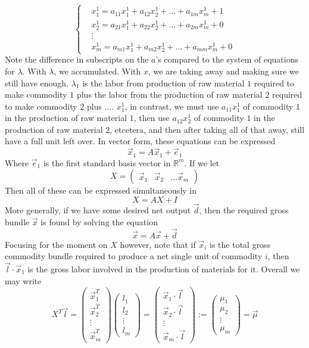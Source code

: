 \[ \begin{cases}
	& x_1^1 = a_{11}x_1^1 + a_{12}x_2^1 + \ldots + a_{1m}x_m^1 + 1 \\
	& x_2^1 = a_{21}x_1^1 + a_{22}x_2^1 + \ldots + a_{2m}x_m^1 + 0 \\
	& \vdots \\
	& x_m^1 = a_{m1}x_1^1 + a_{m2}x_2^1 + \ldots + a_{mm}x_m^1 + 0  
\end{cases} \]
Note the difference in subscripts on the $a$'s compared to the system of equations for $\lambda$. With $\lambda$, we accumulated. With $x$, we are taking away and making sure we still have enough. $\lambda_1$ is the labor from production of raw material $1$ required to make commodity $1$ plus the labor from the production of raw material $2$ required to make commodity $2$ plus $\ldots$. $x_1^1$, in contrast, we must use $a_{11}x_1^1$ of commodity $1$ in the production of raw material $1$, then use $a_{12}x_2^1$ of commodity $1$ in the production of raw material $2$, etcetera, and then after taking all of that away, still have a full unit left over. In vector form, these equations can be expressed
\[\vec{x}_1 = A\vec{x}_1 + \vec{e}_1 \]
Where $\vec{e}_1$ is the first standard basis vector in $\mathbb{R}^m$. If we let 
 \[ X = \begin{pmatrix} \vec{x}_1 & \vec{x}_2 & \ldots \vec{x}_m \end{pmatrix} \]
Then all of these can be expressed simultaneously in
\[ X = AX + I \]
More generally, if we have some desired net output $\vec{d}$, then the required gross bundle $\vec{x}$ is found by solving the equation
\[ \vec{x} = A\vec{x} + \vec{d} \]
Focusing for the moment on $X$ however, note that if $\vec{x}_i$ is the total gross commodity bundle required to produce a net single unit of commodity $i$, then $\vec{l} \cdot \vec{x}_1$ is the gross labor involved in the production of materials for it. Overall we may write
\[ X^T\vec{l} = \begin{pmatrix} \vec{x}_1^T \\ \vec{x}_2^T \\ \vdots \\ \vec{x}_m^T  \end{pmatrix}\begin{pmatrix} l_1 \\ l_2 \\ \vdots \\ l_m \end{pmatrix}
 = \begin{pmatrix} \vec{x}_1 \cdot \vec{l} \\ \vec{x}_2 \cdot \vec{l} \\ \vdots \\ \vec{x}_m \cdot \vec{l} \end{pmatrix} := \begin{pmatrix} \mu_1 \\ \mu_2 \\ \vdots \\ \mu_m \end{pmatrix} = \vec{\mu} \]
